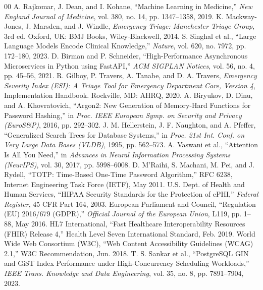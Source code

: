 \documentclass[conference]{IEEEtran}
\begin{document}
\begin{thebibliography}{00}
 A. Rajkomar, J. Dean, and I. Kohane, ``Machine Learning in Medicine,'' \textit{New England Journal of Medicine}, vol. 380, no. 14, pp. 1347--1358, 2019.
 K. Mackway-Jones, J. Marsden, and J. Windle, \textit{Emergency Triage: Manchester Triage Group}, 3rd ed. Oxford, UK: BMJ Books, Wiley-Blackwell, 2014.
 S. Singhal et al., ``Large Language Models Encode Clinical Knowledge,'' \textit{Nature}, vol. 620, no. 7972, pp. 172--180, 2023.
 D. Birman and P. Schneider, ``High-Performance Asynchronous Microservices in Python using FastAPI,'' \textit{ACM SIGPLAN Notices}, vol. 56, no. 4, pp. 45--56, 2021.
 R. Gilboy, P. Travers, A. Tanabe, and D. A. Travers, \textit{Emergency Severity Index (ESI): A Triage Tool for Emergency Department Care, Version 4}, Implementation Handbook. Rockville, MD: AHRQ, 2020.
 A. Biryukov, D. Dinu, and A. Khovratovich, ``Argon2: New Generation of Memory-Hard Functions for Password Hashing,'' in \textit{Proc. IEEE European Symp. on Security and Privacy (EuroS\&P)}, 2016, pp. 292--302.
 J. M. Hellerstein, J. F. Naughton, and A. Pfeffer, ``Generalized Search Trees for Database Systems,'' in \textit{Proc. 21st Int. Conf. on Very Large Data Bases (VLDB)}, 1995, pp. 562--573.
 A. Vaswani et al., ``Attention Is All You Need,'' in \textit{Advances in Neural Information Processing Systems (NeurIPS)}, vol. 30, 2017, pp. 5998--6008.
 D. M'Raihi, S. Machani, M. Pei, and J. Rydell, ``TOTP: Time-Based One-Time Password Algorithm,'' RFC 6238, Internet Engineering Task Force (IETF), May 2011.
 U.S. Dept. of Health and Human Services, ``HIPAA Security Standards for the Protection of ePHI,'' \textit{Federal Register}, 45 CFR Part 164, 2003.
 European Parliament and Council, ``Regulation (EU) 2016/679 (GDPR),'' \textit{Official Journal of the European Union}, L119, pp. 1--88, May 2016.
 HL7 International, ``Fast Healthcare Interoperability Resources (FHIR) Release 4,'' Health Level Seven International Standard, Feb. 2019.
 World Wide Web Consortium (W3C), ``Web Content Accessibility Guidelines (WCAG) 2.1,'' W3C Recommendation, Jun. 2018.
 T. S. Sankar et al., ``PostgreSQL GIN and GiST Index Performance under High-Concurrency Scheduling Workloads,'' \textit{IEEE Trans. Knowledge and Data Engineering}, vol. 35, no. 8, pp. 7891--7904, 2023.

\end{thebibliography}
\end{document}
